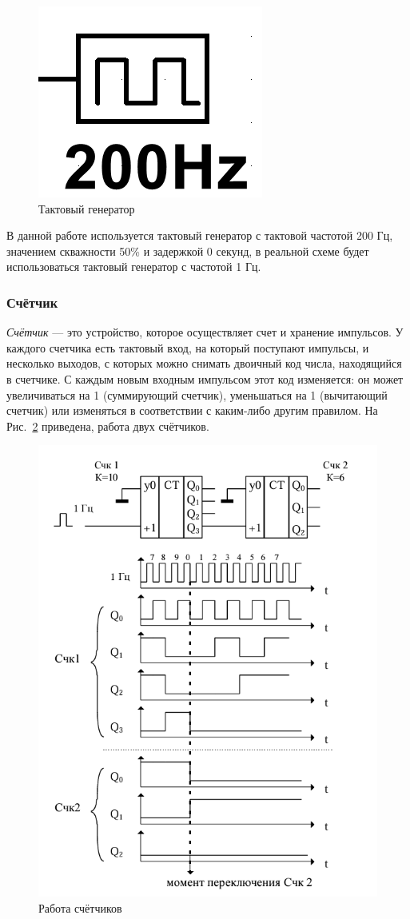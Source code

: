 \documentclass[a4paper, final]{article}
\begin{document}
\begin{figure}[H]
   \centering
   \includegraphics[scale=0.5]{clock.png}
   \caption{Тактовый генератор}
   \label{img:clock}
\end{figure}

В данной работе используется тактовый генератор с тактовой частотой 200 Гц, значением скважности 50\% и задержкой 0 секунд, в реальной схеме будет использоваться тактовый генератор с частотой 1 Гц.

\subsubsection{Счётчик}
\textit{Счётчик} --- это устройство, которое осуществляет счет и хранение импульсов. У каждого счетчика есть тактовый вход, на который поступают импульсы, и несколько выходов, с которых можно снимать двоичный код числа, находящийся в счетчике. С каждым новым входным импульсом этот код изменяется: он может увеличиваться на 1 (суммирующий счетчик), уменьшаться на 1 (вычитающий счетчик) или изменяться в соответствии с каким-либо другим правилом. На Рис.~\ref{img:counters} приведена, работа двух счётчиков.

\begin{figure}[H]
   \centering
   \includegraphics[width=0.5\linewidth]{counters.png}
   \caption{Работа счётчиков}
   \label{img:counters}
\end{figure}
\end{document}
